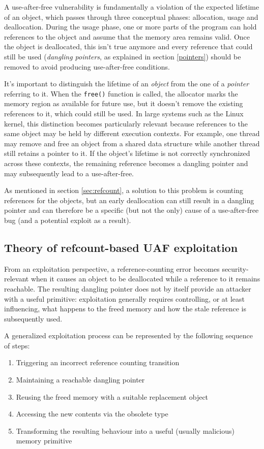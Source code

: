 \noindent A use-after-free vulnerability is fundamentally a violation of the expected lifetime of an object, which passes through three conceptual phases: allocation, usage and deallocation. During the usage phase, one or more parts of the program can hold references to the object and assume that the memory area remains valid. Once the object is deallocated, this isn't true anymore and every reference that could still be used (\textit{dangling pointers}, as explained in section \ref{pointers}) should be removed to avoid producing use-after-free conditions.

It's important to distinguish the lifetime of an \textit{object} from the one of a \textit{pointer} referring to it. When the \texttt{free()} function is called, the allocator marks the memory region as available for future use, but it doesn't remove the existing references to it, which could still be used. In large systems such as the Linux kernel, this distinction becomes particularly relevant because references to the same object may be held by different execution contexts. For example, one thread may remove and free an object from a shared data structure while another thread still retains a pointer to it. If the object's lifetime is not correctly synchronized across these contexts, the remaining reference becomes a dangling pointer and may subsequently lead to a use-after-free.

As mentioned in section \ref{sec:refcount}, a solution to this problem is counting references for the objects, but an early deallocation can still result in a dangling pointer and can therefore be a specific (but not the only) cause of a use-after-free bug (and a potential exploit as a result).

\subsection{Theory of refcount-based UAF exploitation}\label{sec:exploiting-uaf-refcount}

From an exploitation perspective, a reference-counting error becomes security-relevant when it causes an object to be deallocated while a reference to it remains reachable. The resulting dangling pointer does not by itself provide an attacker with a useful primitive: exploitation generally requires controlling, or at least influencing, what happens to the freed memory and how the stale reference is subsequently used.

A generalized exploitation process can be represented by the following sequence of steps:
\begin{enumerate}
    \item Triggering an incorrect reference counting transition
    \item Maintaining a reachable dangling pointer
    \item Reusing the freed memory with a suitable replacement object
    \item Accessing the new contents via the obsolete type
    \item Transforming the resulting behaviour into a useful (usually malicious) memory primitive
\end{enumerate}


